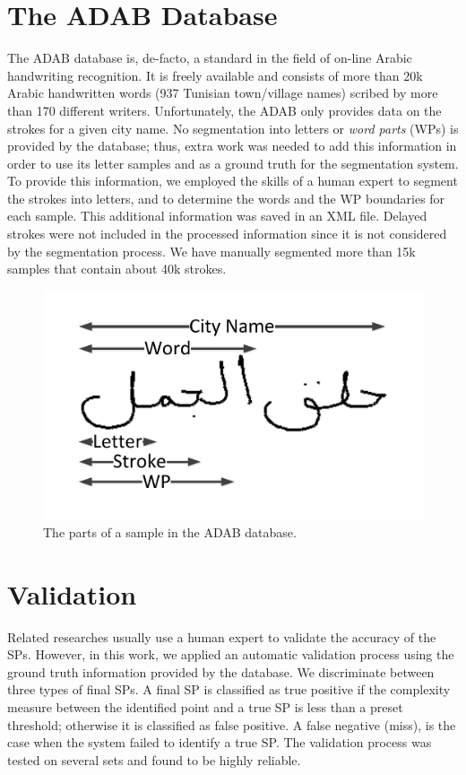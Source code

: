\documentclass[10pt, conference, compsocconf]{IEEEtran}
\begin{document}
\section{The ADAB Database}
\label{sec:database}
The ADAB database is, de-facto, a standard in the field of on-line Arabic handwriting recognition. It is freely available and consists of more than 20k Arabic handwritten words (937 
Tunisian town/village names) scribed by more than 170 different writers. 
Unfortunately, the ADAB only provides data on the strokes for a given city name. 
No segmentation into letters or \emph{word parts} (WPs) is provided by the database; thus, extra work was needed to add this information in order to use its letter samples and as a ground truth for the segmentation system.
To provide this information, we employed the skills of a human expert to segment the strokes into letters, and to determine the words and the WP boundaries for each sample. 
This additional information was saved in an XML file. Delayed strokes were not included in the processed information since it is not considered by the segmentation process.
We have manually segmented more than 15k samples that contain about 40k strokes. \\

\begin{figure}
\centering
\includegraphics[width=0.6\columnwidth]{./figures/sample_parts}
\caption{The parts of a sample in the ADAB database.}
\label{fig:sample_parts}
\end{figure}

\section{Validation}
\label{sec:validation}
Related researches usually use a human expert to validate the accuracy of the SPs. However, in this work, we applied an automatic validation process using the ground truth information provided by the database. We discriminate between three types of final SPs. A final SP is classified as true positive if the complexity measure between the identified point and a true SP is less than a preset threshold; otherwise it is classified as false positive. A false negative (miss), is the case when the system failed to identify a true SP. The validation process was tested on several sets and found to be highly reliable.\\
\end{document}
